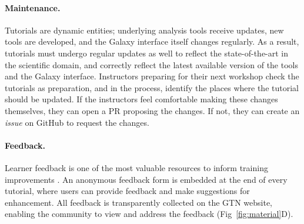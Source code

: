 
\paragraph{Maintenance.}
Tutorials are dynamic entities; underlying analysis tools receive updates, new tools are developed, and the Galaxy interface itself changes regularly.
As a result, tutorials must undergo regular updates as well to reflect the state-of-the-art in the scientific domain, and correctly reflect the latest available version of the tools and the Galaxy interface. Instructors preparing for their next workshop check the tutorials as preparation, and in the process, identify the places where the tutorial should be updated. If the instructors feel comfortable making these changes themselves, they can open a PR proposing the changes. If not, they can create an \emph{issue} on GitHub to request the changes.

\paragraph{Feedback.}
Learner feedback is one of the most valuable resources to inform training improvements \cite{ahea2016value}.
An anonymous feedback form is embedded at the end of every tutorial, where users can provide feedback and make suggestions for enhancement. All feedback is transparently collected on the GTN website, enabling the community to view and address the feedback (Fig~\ref{fig:material}D).


